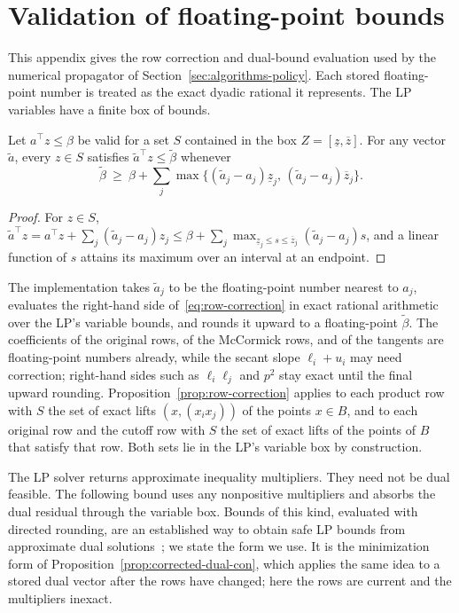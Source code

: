 \section{Validation of floating-point bounds}\label{sec:numerical-validation}

This appendix gives the row correction and dual-bound evaluation used by the
numerical propagator of Section~\ref{sec:algorithms-policy}. Each stored
floating-point number is treated as the exact dyadic rational it represents.
The LP variables have a finite box of bounds.

\begin{proposition}\label{prop:row-correction}
Let $a^\top z\le\beta$ be valid for a set $S$ contained in the box
$Z=[\underline z,\overline z]$. For any vector $\tilde a$, every $z\in S$
satisfies $\tilde a^\top z\le\tilde\beta$ whenever
\begin{equation}\label{eq:row-correction}
 \tilde\beta\ \ge\ \beta+\sum_j
 \max\bigl\{(\tilde a_j-a_j)\underline z_j,\,
            (\tilde a_j-a_j)\overline z_j\bigr\}.
\end{equation}
\end{proposition}

\begin{proof}
For $z\in S$,
$\tilde a^\top z=a^\top z+\sum_j(\tilde a_j-a_j)z_j\le\beta+
\sum_j\max_{\underline z_j\le s\le\overline z_j}(\tilde a_j-a_j)s$, and a linear
function of $s$ attains its maximum over an interval at an endpoint.
\end{proof}

The implementation takes $\tilde a_j$ to be the floating-point number nearest
to $a_j$, evaluates the right-hand side of~\eqref{eq:row-correction} in exact
rational arithmetic over the LP's variable bounds, and rounds it upward to a
floating-point $\tilde\beta$. The coefficients of the original rows, of the
McCormick rows, and of the tangents are floating-point numbers already, while
the secant slope $\ell_i+u_i$ may need correction; right-hand sides such as
$\ell_i\ell_j$ and $p^2$ stay exact until the final upward rounding.
Proposition~\ref{prop:row-correction} applies to each product row with $S$
the set of exact lifts $(x,(x_ix_j))$ of the points $x\in B$, and to each
original row and the cutoff row with $S$ the set of exact lifts of the
points of $B$ that satisfy that row. Both sets lie in the LP's variable box
by construction.

The LP solver returns approximate inequality multipliers. They need not be
dual feasible. The following bound uses any nonpositive multipliers and absorbs
the dual residual through the variable box. Bounds of this kind, evaluated
with directed rounding, are an established way to obtain safe LP bounds
from approximate dual solutions~\cite{neumaier2004-safe-bounds-in-linear-and};
we state the form we use. It is the
minimization form of
Proposition~\ref{prop:corrected-dual-con}, which applies the same idea to a
stored dual vector after the rows have changed; here the rows are current and
the multipliers inexact.

